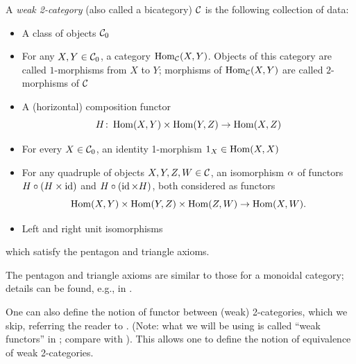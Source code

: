 \begin{definition}\label{d:2-cat-weak}
  A \emph{weak 2-category} (also called a bicategory) $\mathcal{C}$ is the following
  collection of data:
  \begin{itemize}
    \item A class of objects $\mathcal{C}_0$
    \item For any $X, Y\in \mathcal{C}_0$, a category $\operatorname{Hom}_{\mathcal{C}}(X,Y)$. Objects of
      this category are called $1$-morphisms from $X$ to $Y$; morphisms of
      $\operatorname{Hom}_{\mathcal{C}}(X,Y)$ are called $2$-morphisms of $\mathcal{C}$
    \item A (horizontal) composition functor
      $$
        H\colon \operatorname{Hom}(X,Y)\times \operatorname{Hom}(Y,Z)\to \operatorname{Hom}(X,Z)
      $$
    \item For every $X\in \mathcal{C}_0$, an identity 1-morphism $1_X\in \operatorname{Hom}(X,X)$
    \item For any quadruple of objects $X,Y,Z,W\in \mathcal{C}$, an isomorphism
      $\alpha$ of functors $H\circ (H\times \operatorname{id})$ and $H\circ (\operatorname{id} \times H)$,
      both considered as functors
      $$
        \operatorname{Hom}(X,Y)\times \operatorname{Hom}(Y,Z)\times\operatorname{Hom}(Z,W)\to \operatorname{Hom}(X,W).
      $$
    \item Left and right unit isomorphisms
  \end{itemize}
  which satisfy the pentagon and triangle axioms.
\end{definition}
The pentagon and triangle axioms are similar to those for a monoidal category;
details can be found, e.g., in \cite[Section 1.5]{leinster}.


One can also define the notion of functor between (weak) 2-categories, which we
skip, referring the reader to \cite[Definition 1.5.8]{leinster}. (Note: what
we will be using is called ``weak functors'' in \cite{leinster}; compare with
). This allows one to define the notion of equivalence
of weak 2-categories.


